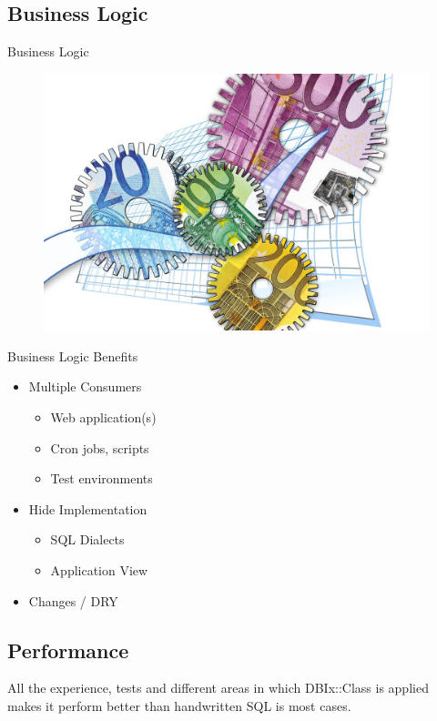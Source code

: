 \subsection{Business Logic}
\begin{frame}{Business Logic}
\begin{figure}[!ht]
\centering
\includegraphics[width=0.75\linewidth]{img/business-logic.jpg}
\end{figure}
\end{frame}

\begin{frame}{Business Logic Benefits}
\begin{itemize}
\item Multiple Consumers
\begin{itemize}
\item Web application(s)
\item Cron jobs, scripts
\item Test environments
\end{itemize}
\item Hide Implementation
\begin{itemize}
\item SQL Dialects
\item Application View
\end{itemize}
\item Changes / DRY
\end{itemize}
\end{frame}

\subsection{Performance}

All the experience, tests and different areas in which 
DBIx::Class is applied makes it perform better than
handwritten SQL is most cases.


